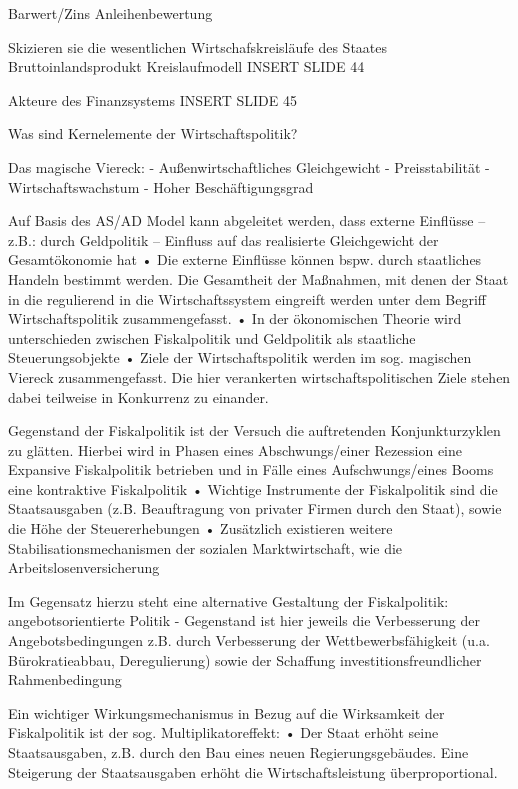 Barwert/Zins Anleihenbewertung



Skizieren sie die wesentlichen Wirtschafskreisläufe des Staates
Bruttoinlandsprodukt Kreislaufmodell
INSERT SLIDE 44

Akteure des Finanzsystems
INSERT SLIDE 45


Was sind Kernelemente der Wirtschaftspolitik?

Das magische Viereck:
- Außenwirtschaftliches Gleichgewicht
- Preisstabilität
- Wirtschaftswachstum
- Hoher Beschäftigungsgrad


Auf Basis des AS/AD Model kann abgeleitet werden, dass externe Einflüsse – z.B.:
durch Geldpolitik – Einfluss auf das realisierte Gleichgewicht der Gesamtökonomie hat
• Die externe Einflüsse können bspw. durch staatliches Handeln bestimmt werden.
Die Gesamtheit der Maßnahmen, mit denen der Staat in die regulierend in die
Wirtschaftssystem eingreift werden unter dem Begriff Wirtschaftspolitik zusammengefasst.
• In der ökonomischen Theorie wird unterschieden zwischen Fiskalpolitik und Geldpolitik
als staatliche Steuerungsobjekte
• Ziele der Wirtschaftspolitik werden im sog. magischen Viereck zusammengefasst.
Die hier verankerten wirtschaftspolitischen Ziele stehen dabei teilweise in Konkurrenz
zu einander.

Gegenstand der Fiskalpolitik ist der Versuch die auftretenden Konjunkturzyklen zu glätten.
Hierbei wird in Phasen eines Abschwungs/einer Rezession eine Expansive Fiskalpolitik
betrieben und in Fälle eines Aufschwungs/eines Booms eine kontraktive Fiskalpolitik
• Wichtige Instrumente der Fiskalpolitik sind die Staatsausgaben (z.B. Beauftragung von
privater Firmen durch den Staat), sowie die Höhe der Steuererhebungen
• Zusätzlich existieren weitere Stabilisationsmechanismen der sozialen Marktwirtschaft,
wie die Arbeitslosenversicherung

Im Gegensatz hierzu steht eine alternative Gestaltung der Fiskalpolitik:
angebotsorientierte Politik
- Gegenstand ist hier jeweils die Verbesserung der Angebotsbedingungen
z.B. durch Verbesserung der Wettbewerbsfähigkeit (u.a. Bürokratieabbau, Deregulierung)
sowie der Schaffung investitionsfreundlicher Rahmenbedingung

Ein wichtiger Wirkungsmechanismus in Bezug auf die Wirksamkeit der Fiskalpolitik
ist der sog. Multiplikatoreffekt:
• Der Staat erhöht seine Staatsausgaben, z.B. durch den Bau eines neuen
Regierungsgebäudes.
Eine Steigerung der Staatsausgaben erhöht die Wirtschaftsleistung überproportional.

